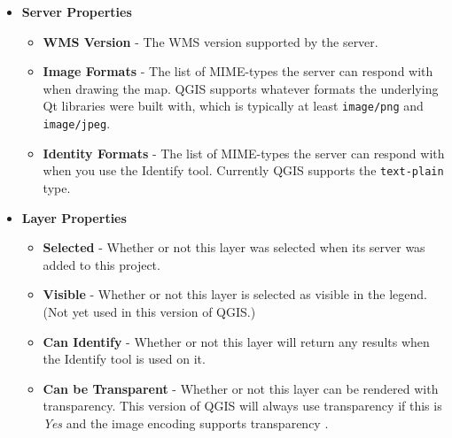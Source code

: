 \begin{itemize}
\item \textbf{Server Properties}

\begin{itemize}
\item \textbf{WMS Version}      - The WMS version supported by the server.

\item \textbf{Image Formats}    - The list of MIME-types the server can respond with when
                                  drawing the map.  QGIS supports whatever formats
                                  the underlying Qt libraries were built with, which
                                  is typically at least \texttt{image/png} 
                                  and \texttt{image/jpeg}.

\item \textbf{Identity Formats} - The list of MIME-types the server can respond with when
                                  you use the Identify tool.  Currently QGIS supports
                                  the \texttt{text-plain} type.

\end{itemize}

\item \textbf{Layer Properties}

\begin{itemize}
\item \textbf{Selected}         - Whether or not this layer was selected when its                                                                        server was added to this project.

\item \textbf{Visible}          - Whether or not this layer is selected as visible
                                  in the legend.  (Not yet used in this version of QGIS.)

\item \textbf{Can Identify}     - Whether or not this layer will return any results
                                  when the Identify tool is used on it.

\item \textbf{Can be Transparent} - Whether or not this layer can be rendered with transparency.
                                    This version of 
                                    QGIS will always use transparency if this is \textsl{Yes}
                                    and the image encoding supports transparency
                                    .


\end{itemize}
\end{itemize}
